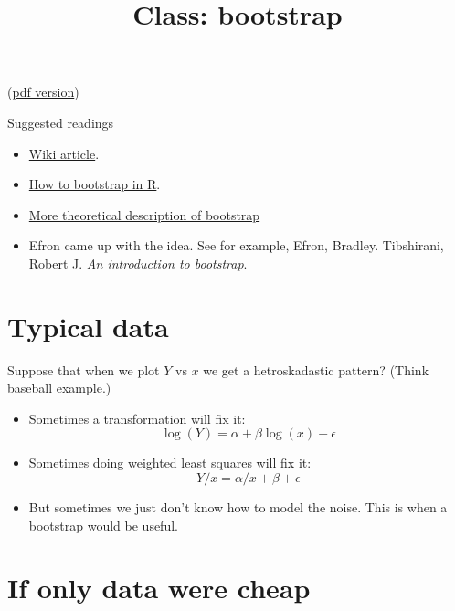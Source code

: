 \documentclass{article}
\begin{document}
\title{Class: bootstrap}

(\href{class_bootstrap.pdf}{pdf version})

Suggested readings
\begin{itemize}
\item \href{http://en.wikipedia.org/wiki/Bootstrapping_(statistics)}{Wiki article}.
\item \href{http://www.ats.ucla.edu/stat/R/library/bootstrap.htm}{How
to bootstrap in R}.
\item
\href{http://cran.r-project.org/doc/contrib/Fox-Companion/appendix-bootstrapping.pdf}{More
theoretical description of bootstrap} 
\item Efron came up with the idea.  See for example, Efron,
Bradley. Tibshirani, Robert J. {\em An introduction to bootstrap}.
\end{itemize}


\section{Typical data}

Suppose that when we plot $Y$ vs $x$ we get a hetroskadastic pattern?
(Think baseball example.)  
\begin{itemize}
\item Sometimes a transformation will fix it:
\begin{displaymath}
\log(Y) = \alpha + \beta \log(x) + \epsilon
\end{displaymath}
\item Sometimes doing weighted least squares will fix it:
\begin{displaymath}
Y/x = \alpha/x + \beta + \epsilon
\end{displaymath}
\item But sometimes we just don't know how to model the noise.  This
is when a bootstrap would be useful.
\end{itemize}

\section{If only data were cheap}
\end{document}
